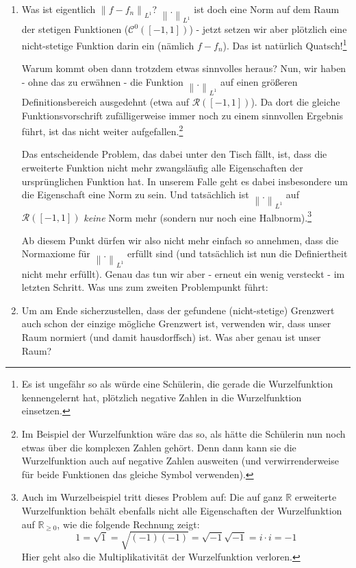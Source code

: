 \documentclass[a4paper,ngerman,12pt,bibtotoc]{scrartcl}
\theoremstyle{definition}
\theoremstyle{plain}
\theoremstyle{remark}
\newcommand{\RR}{\mathbb{R}}
\newcommand{\lInorm}[1]{\left\lVert #1 \right\rVert_{L^1}}
\begin{document}
	\begin{enumerate}
		\item Was ist eigentlich $\lInorm{f-f_n}$? $\lInorm{.}$ ist doch eine Norm auf dem Raum der stetigen Funktionen ($\mathcal{C}^0\left(\left[-1,1\right]\right)$) - jetzt setzen wir aber plötzlich eine nicht-stetige Funktion darin ein (nämlich $f-f_n$). Das ist natürlich Quatsch!\footnote{Es ist ungefähr so als würde eine Schülerin, die gerade die Wurzelfunktion kennengelernt hat, plötzlich negative Zahlen in die Wurzelfunktion einsetzen.}
		
		Warum kommt oben dann trotzdem etwas \glqq sinnvolles\grqq{} heraus? Nun, wir haben - ohne das zu erwähnen - die Funktion $\lInorm{.}$ auf einen größeren Definitionsbereich ausgedehnt (etwa auf $\mathcal{R}\left(\left[-1,1\right]\right)$). Da dort die gleiche Funktionsvorschrift zufälligerweise immer noch zu einem sinnvollen Ergebnis führt, ist das nicht weiter aufgefallen.\footnote{Im Beispiel der Wurzelfunktion wäre das so, als hätte die Schülerin nun noch etwas über die komplexen Zahlen gehört. Denn dann kann sie die Wurzelfunktion auch auf negative Zahlen ausweiten (und verwirrenderweise für beide Funktionen das gleiche Symbol verwenden).}
		
		Das entscheidende Problem, das dabei unter den Tisch fällt, ist, dass die erweiterte Funktion nicht mehr zwangsläufig alle Eigenschaften der ursprünglichen Funktion hat. In unserem Falle geht es dabei insbesondere um die Eigenschaft eine Norm zu sein. Und tatsächlich ist $\lInorm{.}$ auf $\mathcal{R}\left(\left[-1,1\right]\right)$ \emph{keine} Norm mehr (sondern nur noch eine Halbnorm).\footnote{Auch im Wurzelbeispiel tritt dieses Problem auf: Die auf ganz $\RR$ erweiterte Wurzelfunktion behält ebenfalls nicht alle Eigenschaften der Wurzelfunktion auf $\RR_{\geq 0}$, wie die folgende Rechnung zeigt:
			\[1 = \sqrt{1} = \sqrt{(-1)(-1)} = \sqrt{-1}\sqrt{-1}=i\cdot i = -1\]
		Hier geht also die Multiplikativität der Wurzelfunktion verloren.}
	
		Ab diesem Punkt dürfen wir also nicht mehr einfach so annehmen, dass die Normaxiome für $\lInorm{.}$ erfüllt sind (und tatsächlich ist nun die Definiertheit nicht mehr erfüllt). Genau das tun wir aber - erneut ein wenig versteckt - im letzten Schritt. Was uns zum zweiten Problempunkt führt:
		
		\item Um am Ende sicherzustellen, dass der gefundene (nicht-stetige) Grenzwert auch schon der einzige mögliche Grenzwert ist, verwenden wir, dass \glqq unser Raum\grqq{} normiert (und damit hausdorffsch) ist. Was aber genau ist \glqq unser Raum\grqq{}?
		

\end{enumerate}
\end{document}
